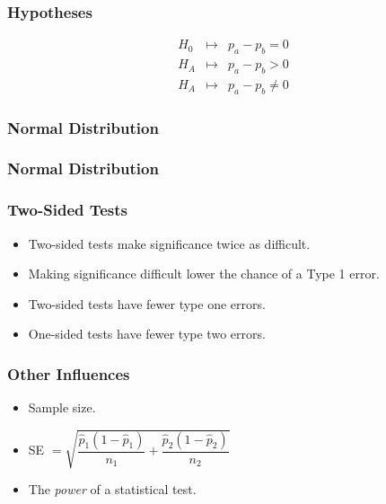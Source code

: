 \documentclass{beamer}
\begin{document}
\begin{frame}
  \frametitle{Hypotheses}
  \begin{displaymath}
    \begin{array}{rcl}
      H_0 & \mapsto & p_a - p_b = 0 \\[2em]
      H_A & \mapsto & p_a - p_b > 0 \\[2em]
      H_A & \mapsto & p_a - p_b \neq 0 
    \end{array}
  \end{displaymath} 
\end{frame}

\begin{frame}
  \frametitle{Normal Distribution}
  \centering
\end{frame}

\begin{frame}
  \frametitle{Normal Distribution}
  \centering
\end{frame}

\begin{frame}
  \frametitle{Two-Sided Tests}
  \begin{itemize}
    \item[] Two-sided tests make significance twice as difficult. 
      \vspace{0.5cm}
    \item[] Making significance difficult lower the chance of a Type 1
    error. 
      \vspace{0.5cm}
    \item[] Two-sided tests have fewer type one errors.
      \vspace{0.5cm}
    \item[] One-sided tests have fewer type two errors. 
  \end{itemize}
\end{frame}

\begin{frame}
  \frametitle{Other Influences}
  \begin{itemize}
    \item[] 
      Sample size. 
      \vspace{0.5cm}
    \item[] 
      SE $ = \sqrt{ \dfrac{\hat{p}_1 (1 - \hat{p}_1)}{n_1} +
      \dfrac{\hat{p}_2 (1 - \hat{p}_2)}{n_2}}$ 
      \vspace{0.5cm}
    \item[] 
      The \emph{power} of a statistical test. 
  \end{itemize}
\end{frame}
\end{document}
